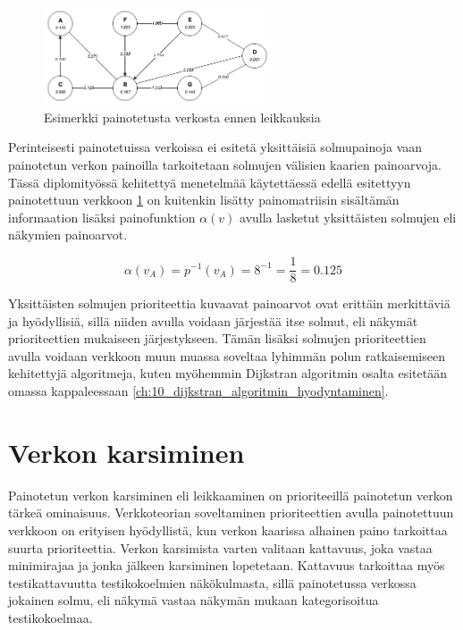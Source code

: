   \begin{figure}[H]
    \centering
    \includegraphics[width=0.6\textwidth]{assets/painotettu-verkko-ennen.png}
    \caption{Esimerkki painotetusta verkosta ennen leikkauksia}
    \label{fig:painotettu-verkko-ennen}
  \end{figure}

  Perinteisesti painotetuissa verkoissa ei esitetä yksittäisiä solmupainoja vaan painotetun verkon painoilla tarkoitetaan solmujen välisien kaarien painoarvoja.
  Tässä diplomityössä kehitettyä menetelmää käytettäessä edellä esitettyyn painotettuun verkkoon \ref{fig:painotettu-verkko-ennen} on kuitenkin lisätty painomatriisin sisältämän informaation lisäksi painofunktion \(\alpha(v)\) avulla lasketut yksittäisten solmujen eli näkymien painoarvot.

  \[\alpha(v_A) = p^{-1}(v_A) = 8^{-1} = \frac{1}{8} = 0.125\]

  Yksittäisten solmujen prioriteettia kuvaavat painoarvot ovat erittäin merkittäviä ja hyödyllisiä, sillä niiden avulla voidaan järjestää itse solmut, eli näkymät prioriteettien mukaiseen järjestykseen.
  Tämän lisäksi solmujen prioriteettien avulla voidaan verkkoon muun muassa soveltaa lyhimmän polun ratkaisemiseen kehitettyjä algoritmeja, kuten myöhemmin Dijkstran algoritmin osalta esitetään omassa kappaleessaan \ref{ch:10_dijkstran_algoritmin_hyodyntaminen}.

\section{Verkon karsiminen} \label{ch:10_verkon_karsiminen}

  Painotetun verkon karsiminen eli leikkaaminen on prioriteeillä painotetun verkon tärkeä ominaisuus.
  Verkkoteorian soveltaminen prioriteettien avulla painotettuun verkkoon on erityisen hyödyllistä, kun verkon kaarissa alhainen paino tarkoittaa suurta prioriteettia.
  Verkon karsimista varten valitaan kattavuus, joka vastaa minimirajaa ja jonka jälkeen karsiminen lopetetaan.
  Kattavuus tarkoittaa myös testikattavuutta testikokoelmien näkökulmasta, sillä painotetussa verkossa jokainen solmu, eli näkymä vastaa näkymän mukaan kategorisoitua testikokoelmaa.

